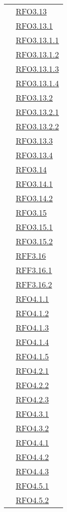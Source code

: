 \begin{longtable}{|>{\centering}m{5cm}|m{5cm}<{\centering}|}
& \hyperlink{RFO3.13}{RFO3.13}\\
& \hyperlink{RFO3.13.1}{RFO3.13.1}\\
& \hyperlink{RFO3.13.1.1}{RFO3.13.1.1}\\
& \hyperlink{RFO3.13.1.2}{RFO3.13.1.2}\\
& \hyperlink{RFO3.13.1.3}{RFO3.13.1.3}\\
& \hyperlink{RFO3.13.1.4}{RFO3.13.1.4}\\
& \hyperlink{RFO3.13.2}{RFO3.13.2}\\
& \hyperlink{RFO3.13.2.1}{RFO3.13.2.1}\\
& \hyperlink{RFO3.13.2.2}{RFO3.13.2.2}\\
& \hyperlink{RFO3.13.3}{RFO3.13.3}\\
& \hyperlink{RFO3.13.4}{RFO3.13.4}\\
& \hyperlink{RFO3.14}{RFO3.14}\\
& \hyperlink{RFO3.14.1}{RFO3.14.1}\\
& \hyperlink{RFO3.14.2}{RFO3.14.2}\\
& \hyperlink{RFO3.15}{RFO3.15}\\
& \hyperlink{RFO3.15.1}{RFO3.15.1}\\
& \hyperlink{RFO3.15.2}{RFO3.15.2}\\
& \hyperlink{RFF3.16}{RFF3.16}\\
& \hyperlink{RFF3.16.1}{RFF3.16.1}\\
& \hyperlink{RFF3.16.2}{RFF3.16.2}\\
& \hyperlink{RFO4.1.1}{RFO4.1.1}\\
& \hyperlink{RFO4.1.2}{RFO4.1.2}\\
& \hyperlink{RFO4.1.3}{RFO4.1.3}\\
& \hyperlink{RFO4.1.4}{RFO4.1.4}\\
& \hyperlink{RFO4.1.5}{RFO4.1.5}\\
& \hyperlink{RFO4.2.1}{RFO4.2.1}\\
& \hyperlink{RFO4.2.2}{RFO4.2.2}\\
& \hyperlink{RFO4.2.3}{RFO4.2.3}\\
& \hyperlink{RFO4.3.1}{RFO4.3.1}\\
& \hyperlink{RFO4.3.2}{RFO4.3.2}\\
& \hyperlink{RFO4.4.1}{RFO4.4.1}\\
& \hyperlink{RFO4.4.2}{RFO4.4.2}\\
& \hyperlink{RFO4.4.3}{RFO4.4.3}\\
& \hyperlink{RFO4.5.1}{RFO4.5.1}\\
& \hyperlink{RFO4.5.2}{RFO4.5.2}\\

\end{longtable}
